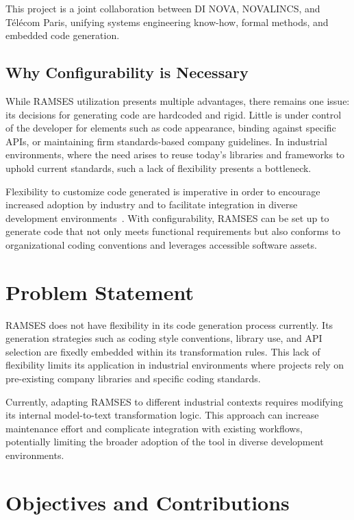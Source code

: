 This project is a joint collaboration between \gls{DI} NOVA, NOVALINCS, and Télécom Paris, unifying systems engineering know-how, formal methods, and embedded code generation.


\subsection{Why Configurability is Necessary}

While \gls{RAMSES} utilization presents multiple advantages, there remains one issue: its decisions for generating code are hardcoded and rigid. Little is under control of the developer for elements such as code appearance, binding against specific APIs, or maintaining firm standards-based company guidelines. In industrial environments, where the need arises to reuse today's libraries and frameworks to uphold current standards, such a lack of flexibility presents a bottleneck. 
\par
Flexibility to customize code generated is imperative in order to encourage increased adoption by industry and to facilitate integration in diverse development environments~\cite{Mikova_2025}. With configurability, \gls{RAMSES} can be set up to generate code that not only meets functional requirements but also conforms to organizational coding conventions and leverages accessible software assets.

\section{Problem Statement}

\gls{RAMSES} does not have flexibility in its code generation process currently. Its generation strategies such as coding style conventions, library use, and \gls{API} selection are fixedly embedded within its transformation rules. This lack of flexibility limits its application in industrial environments where projects rely on pre-existing company libraries and specific coding standards.
\par
Currently, adapting \gls{RAMSES} to different industrial contexts requires modifying its internal model-to-text transformation logic. This approach can increase maintenance effort and complicate integration with existing workflows, potentially limiting the broader adoption of the tool in diverse development environments. 


\section{Objectives and Contributions}

